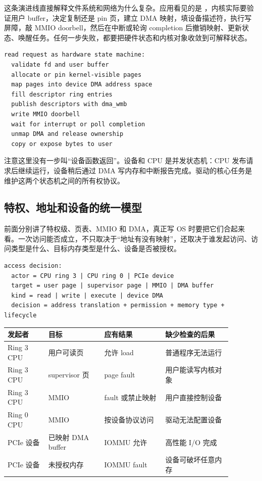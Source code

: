 这条演进线直接解释文件系统和网络为什么复杂。应用看见的是 ，内核实际要验证用户 buffer，决定复制还是 pin 页，建立 DMA 映射，填设备描述符，执行写屏障，敲 MMIO doorbell，然后在中断或轮询 completion 后撤销映射、更新状态、唤醒任务。任何一步失败，都要把硬件状态和内核对象收敛到可解释状态。

\begin{lstlisting}
read request as hardware state machine:
  validate fd and user buffer
  allocate or pin kernel-visible pages
  map pages into device DMA address space
  fill descriptor ring entries
  publish descriptors with dma_wmb
  write MMIO doorbell
  wait for interrupt or poll completion
  unmap DMA and release ownership
  copy or expose bytes to user
\end{lstlisting}

注意这里没有一步叫“设备函数返回”。设备和 CPU 是并发状态机：CPU 发布请求后继续运行，设备稍后通过 DMA 写内存和中断报告完成。驱动的核心任务是维护这两个状态机之间的所有权协议。

\subsection{特权、地址和设备的统一模型}

前面分别讲了特权级、页表、MMIO 和 DMA，真正写 OS 时要把它们合起来看。一次访问能否成立，不只取决于“地址有没有映射”，还取决于谁发起访问、访问类型是什么、目标内存类型是什么、设备是否被授权。

\begin{lstlisting}
access decision:
  actor = CPU ring 3 | CPU ring 0 | PCIe device
  target = user page | supervisor page | MMIO | DMA buffer
  kind = read | write | execute | device DMA
  decision = address translation + permission + memory type + lifecycle
\end{lstlisting}

\begin{longtable}{p{0.16\linewidth}p{0.22\linewidth}p{0.24\linewidth}p{0.26\linewidth}}
\toprule
发起者 & 目标 & 应有结果 & 缺少检查的后果 \\
\midrule
Ring 3 CPU & 用户可读页 & 允许 load & 普通程序无法运行 \\
Ring 3 CPU & supervisor 页 & page fault & 用户能读写内核对象 \\
Ring 3 CPU & MMIO & fault 或禁止映射 & 用户直接控制设备 \\
Ring 0 CPU & MMIO & 按设备协议访问 & 驱动无法配置设备 \\
PCIe 设备 & 已映射 DMA buffer & IOMMU 允许 & 高性能 I/O 完成 \\
PCIe 设备 & 未授权内存 & IOMMU fault & 设备可破坏任意内存 \\
\bottomrule
\end{longtable}

